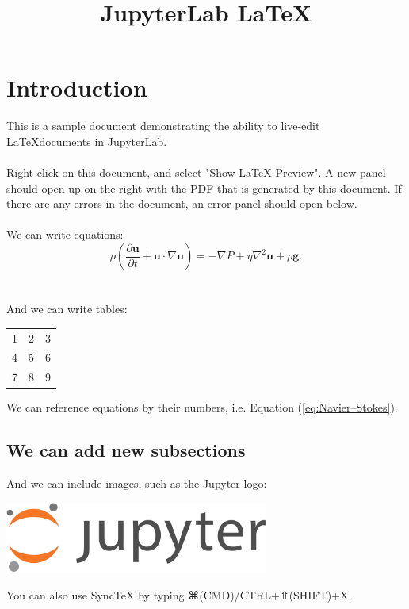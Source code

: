 \documentclass{article}
\begin{document}
\title{JupyterLab \LaTeX}
\date{}
\maketitle

\section{Introduction}
This is a sample document demonstrating the ability to live-edit
\LaTeX documents in JupyterLab.
\\
\\
Right-click on this document, and select "Show LaTeX Preview".
A new panel should open up on the right with the PDF that is generated
by this document. If there are any errors in the document, an
error panel should open below.
\\
\\
We can write equations:
\begin{equation}
    \rho \left( \frac{\partial \mathbf{u}}{\partial t} + \mathbf{u} \cdot \nabla \mathbf{u} \right) =
    -\nabla P + \eta \nabla^2 \mathbf{u} + \rho \mathbf{g}.
\label{eq:Navier–Stokes}
\end{equation}
\\
\\
And we can write tables:
\begin{center}
  \begin{tabular}{ | l | c | r| }
    \hline
    1 & 2 & 3 \\ 
    4 & 5 & 6 \\ 
    7 & 8 & 9 \\
    \hline
  \end{tabular}
\end{center}

We can reference equations by their numbers, i.e. Equation (\ref{eq:Navier–Stokes}).

\subsection{We can add new subsections}
And we can include images, such as the Jupyter logo:
\begin{center}
  \includegraphics[width=0.65\textwidth]{images/jupyter_logo.png}
\end{center}



\pagebreak




You can also use SyncTeX by typing ⌘(CMD)/CTRL+⇧(SHIFT)+X.
\end{document}
